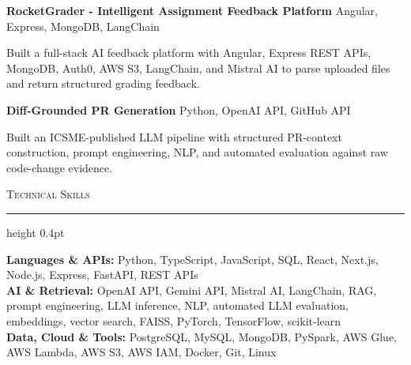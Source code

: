 \documentclass[letterpaper,11pt]{article}
\newcommand{\resumesection}[1]{%
  \par\vspace{2pt}%
  {\large\scshape #1}\par\vspace{2pt}%
  \hrule height 0.4pt\vspace{2pt}%
}
\newcommand{\projectHeading}[2]{
  \textbf{#1} \hfill #2
}
\begin{document}
\projectHeading{RocketGrader - Intelligent Assignment Feedback Platform}{Angular, Express, MongoDB, LangChain}
\begin{tightitemize}
  \item Built a full-stack AI feedback platform with Angular, Express REST APIs, MongoDB, Auth0, AWS S3, LangChain, and Mistral AI to parse uploaded files and return structured grading feedback.
\end{tightitemize}

\projectHeading{Diff-Grounded PR Generation}{Python, OpenAI API, GitHub API}
\begin{tightitemize}
  \item Built an ICSME-published LLM pipeline with structured PR-context construction, prompt engineering, NLP, and automated evaluation against raw code-change evidence.
\end{tightitemize}

\resumesection{Technical Skills}
\textbf{Languages \& APIs:} Python, TypeScript, JavaScript, SQL, React, Next.js, Node.js, Express, FastAPI, REST APIs\\
\textbf{AI \& Retrieval:} OpenAI API, Gemini API, Mistral AI, LangChain, RAG, prompt engineering, LLM inference, NLP, automated LLM evaluation, embeddings, vector search, FAISS, PyTorch, TensorFlow, scikit-learn\\
\textbf{Data, Cloud \& Tools:} PostgreSQL, MySQL, MongoDB, PySpark, AWS Glue, AWS Lambda, AWS S3, AWS IAM, Docker, Git, Linux
\end{document}
